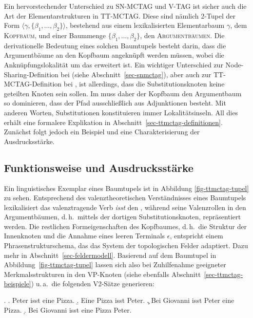 Ein hervorstechender Unterschied zu SN-MCTAG und V-TAG ist sicher auch die Art der Elementarstrukturen in TT-MCTAG. Diese sind nämlich 2-Tupel der Form $\langle \gamma, \{\beta_1,\ldots,\beta_2\}\rangle$, bestehend aus einem lexikalisierten Elementarbaum $\gamma$, dem \textsc{Kopfbaum}, und einer Baummenge $\{\beta_1,\ldots,\beta_2\}$, den \textsc{Argumentbäumen}. Die derivationelle Bedeutung eines solchen Baumtupels besteht darin, dass die Argumentbäume an den Kopfbaum angeknüpft werden müssen, wobei die Anknüpfungslokalität um das  erweitert ist. Ein wichtiger Unterschied zur Node-Sharing-Definition bei \cite{Kallmeyer:05} (siehe Abschnitt~\ref{sec-snmctag}), aber auch zur TT-MCTAG-Definition bei \cite{Kallmeyer:09}, ist allerdings, dass die Substitutionsknoten keine geteilten Knoten sein sollen. Im  muss daher der Kopfbaum den Argumentbaum so dominieren, dass der Pfad ausschlie\ss lich aus Adjunktionen besteht. Mit anderen Worten, Substitutionen konstituieren immer Lokalitätsinseln. All dies erhält eine formalere Explikation in Abschnitt~\ref{sec-ttmctag-definitionen}. Zunächst folgt jedoch ein Beispiel und eine Charakterisierung der Ausdrucksstärke.  

\subsection{Funktionsweise und Ausdrucksstärke} \label{sec-ttmctag-funktionausdruck}

Ein linguistisches Exemplar eines Baumtupels ist in Abbildung \ref{fig-ttmctag-tupel} zu sehen. Entsprechend des valenztheoretischen Verständnisses eines Baumtupels lexikalisiert das valenztragende Verb {\it isst} den , während seine Valenzrollen in den Argumentbäumen, d.\,h.\ mittels der dortigen Substitutionsknoten, repräsentiert werden. Die restlichen Formeigenschaften des Kopfbaumes, d.\,h.\ die Struktur der Innenknoten und die Annahme eines leeren Terminals $\epsilon$,  entspricht einem Phrasenstrukturschema, das das System der topologischen Felder adaptiert. Dazu mehr in Abschnitt~\ref{sec-feldermodell}. Basierend auf dem Baumtupel in Abbildung~\ref{fig-ttmctag-tupel} lassen sich also bei Zuhilfenahme geeigneter Merkmalsstrukturen in den VP-Knoten (siehe ebenfalls Abschnitt~\ref{sec-ttmctag-beispiele}) u.\,a.\ die folgenden V2-Sätze generieren:  

\ex. \label{ex-scrambling}
\a. Peter isst eine Pizza. \label{ex-scrambling-a}
\b. Eine Pizza isst Peter. \label{ex-scrambling-b}
\c. Bei Giovanni isst Peter eine Pizza. \label{ex-scrambling-c}
\d. Bei Giovanni isst eine Pizza Peter. \label{ex-scrambling-d}

